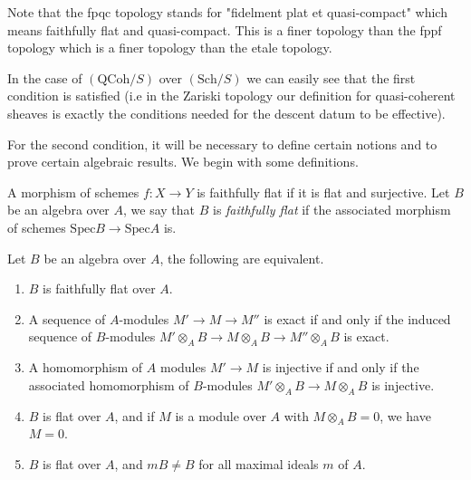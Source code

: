 \noindent
Note that the fpqc topology stands for "fidelment plat et quasi-compact" which
means faithfully flat and quasi-compact.  This is a finer topology than the
fppf topology which is a finer topology than the etale topology.


\medskip\noindent In the case of $(\text{QCoh}/S)$ over
$(\text{Sch}/S)$ we can easily see that the first condition is
satisfied (i.e in the Zariski topology our definition for
quasi-coherent sheaves is exactly the conditions needed for the
descent datum to be effective).

\medskip\noindent For the second condition, it will be necessary to
define certain notions and to prove certain algebraic results.  We
begin with some definitions.

\begin{definition}
\label{definition-faithfully-flat}
A morphism of schemes $f: X \rightarrow Y$ is faithfully flat if it is flat
and surjective.  Let $B$ be an algebra over $A$, we say that $B$ is
{\it faithfully flat} if the associated morphism of schemes
$\text{Spec} B \rightarrow \text{Spec} A$ is.
\end{definition}

\begin{proposition}
\label{proposition-faithfully-flat}
Let $B$ be an algebra over $A$, the following are equivalent.
\begin{enumerate}
\item $B$ is faithfully flat over $A$.
\item A sequence of $A$-modules $M' \rightarrow M \rightarrow M''$ is exact
if and only if the induced sequence of $B$-modules
$M' \otimes_A B \rightarrow M \otimes_A B \rightarrow M'' \otimes_A B$
is exact.
\item A homomorphism of $A$ modules $M' \rightarrow M$ is injective if and
only if the associated homomorphism of $B$-modules
$M' \otimes_A B \rightarrow M \otimes_A B$ is injective.
\item $B$ is flat over $A$, and if $M$ is a module over $A$ with
$M \otimes_A B = 0$, we have $M = 0$.
\item $B$ is flat over $A$, and $mB \neq B$ for all maximal ideals $m$
of $A$.	
\end{enumerate}
\end{proposition}

